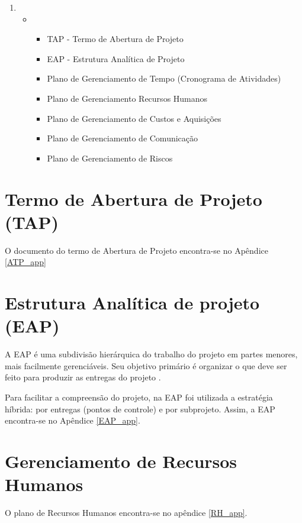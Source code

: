 \begin{enumerate}
    \item[ ]
    \begin{itemize}
        \item[ ]
        \begin{itemize}
            \item TAP - Termo de Abertura de Projeto
            \item EAP - Estrutura Analítica de Projeto
            \item Plano de Gerenciamento de Tempo (Cronograma de Atividades)
            \item Plano de Gerenciamento Recursos Humanos
            \item Plano de Gerenciamento de Custos e Aquisições
            \item Plano de Gerenciamento de Comunicação
            \item Plano de Gerenciamento de Riscos
        \end{itemize}
    \end{itemize}
\end{enumerate}


\section{Termo de Abertura de Projeto (TAP)}

O documento do termo de Abertura de Projeto encontra-se no Apêndice \ref{ATP_app}

\section{Estrutura Analítica de projeto (EAP)}

A EAP é uma subdivisão hierárquica do trabalho do projeto em partes menores, mais facilmente gerenciáveis. Seu objetivo primário é organizar o que deve ser feito para produzir as entregas do projeto \cite{EUAX_2018}. 

Para facilitar a compreensão do projeto, na EAP foi utilizada a estratégia híbrida: por entregas (pontos de controle) e por subprojeto. Assim, a EAP encontra-se no Apêndice \ref{EAP_app}.


\section{Gerenciamento de Recursos Humanos}

O plano de Recursos Humanos encontra-se no apêndice \ref{RH_app}.

